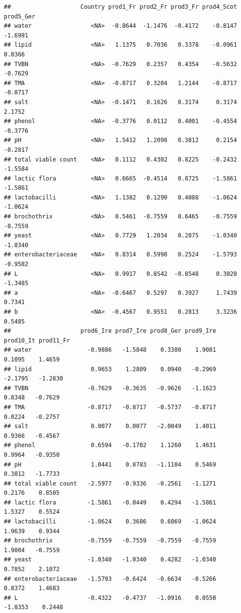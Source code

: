 \documentclass[
]{book}
\begin{document}
\begin{verbatim}
##                    Country prod1_Fr prod2_Fr prod3_Fr prod4_Scot prod5_Ger
## water                 <NA>  -0.8644  -1.1476  -0.4172    -0.8147   -1.6991
## lipid                 <NA>   1.1375   0.7036   0.3378    -0.0961    0.0366
## TVBN                  <NA>  -0.7629   0.2357   0.4354    -0.5632   -0.7629
## TMA                   <NA>  -0.8717   0.3204   1.2144    -0.8717   -0.8717
## salt                  <NA>  -0.1471   0.1626   0.3174     0.3174    2.1752
## phenol                <NA>  -0.3776   0.0112   0.4001    -0.4554   -0.3776
## pH                    <NA>   1.5412   1.2098   0.3812     0.2154   -0.2817
## total viable count    <NA>   0.1112   0.4302   0.8225    -0.2432   -1.5584
## lactic flora          <NA>   0.6665  -0.4514   0.8725    -1.5861   -1.5861
## lactobacilli          <NA>   1.1382   0.1290   0.4088    -1.0624   -1.0624
## brochothrix           <NA>   0.5461  -0.7559   0.6465    -0.7559   -0.7559
## yeast                 <NA>   0.7729   1.2034   0.2875    -1.0340   -1.0340
## enterobacteriaceae    <NA>   0.8314   0.5998   0.2524    -1.5793   -0.9582
## L                     <NA>   0.9917   0.8542  -0.8548     0.3020   -1.3485
## a                     <NA>  -0.6467   0.5297   0.3927     1.7439    0.7341
## b                     <NA>  -0.4567   0.9551   0.2813     3.3236    0.5485
##                    prod6_Ire prod7_Ire prod8_Ger prod9_Ire prod10_It prod11_Fr
## water                -0.9886   -1.5848    0.3380    1.9081    0.1095    1.4659
## lipid                 0.9653    1.2809    0.0940   -0.2969   -2.1795   -1.2830
## TVBN                 -0.7629   -0.3635   -0.9626   -1.1623    0.8348   -0.7629
## TMA                  -0.8717   -0.8717   -0.5737   -0.8717    0.0224   -0.2757
## salt                  0.0077    0.0077   -2.0049    1.4011    0.9366   -0.4567
## phenol                0.6594   -0.1702    1.1260    1.4631    0.9964   -0.9350
## pH                    1.0441    0.8783   -1.1104    0.5469    0.3812   -1.7733
## total viable count   -2.5977   -0.9336   -0.2561   -1.1271    0.2176    0.8505
## lactic flora         -1.5861   -0.0449    0.4294   -1.5861    1.5327    0.5524
## lactobacilli         -1.0624    0.3686    0.6069   -1.0624    1.9639    0.9344
## brochothrix          -0.7559   -0.7559   -0.7559   -0.7559    1.9004   -0.7559
## yeast                -1.0340   -1.0340    0.4282   -1.0340    0.7852    2.1072
## enterobacteriaceae   -1.5793   -0.6424   -0.6634   -0.5266    0.8372    1.4683
## L                    -0.4322   -0.4737   -1.0916    0.0550   -1.8353    0.2448

\end{verbatim}
\end{document}
